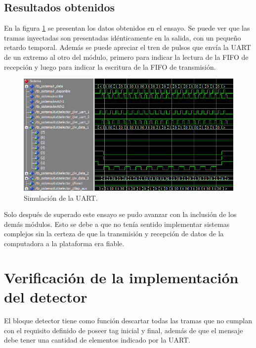 	\subsection{Resultados obtenidos}
				
		En la figura \ref{fig:Test_UART} se presentan los datos obtenidos en el ensayo. Se puede ver que las tramas inyectadas son presentadas idénticamente en la salida, con un pequeño retardo temporal. Además se puede apreciar el tren de pulsos que envía la UART de un extremo al otro del módulo, primero para indicar la lectura de la FIFO de recepción y luego para indicar la escritura de la FIFO de transmisión.
		
		\begin{figure}[h]
		\centering
		\includegraphics[scale=0.7]{./Figures/Test/UART}
			\caption{Simulación de la UART.}
			\label{fig:Test_UART}
		\end{figure}
			
		\vspace{10cm}
			
		Solo después de superado este ensayo se pudo avanzar con la inclusión de los demás módulos. Esto se debe a que no tenía sentido implementar sistemas complejos sin la certeza de que la transmisión y recepción de datos de la computadora a la plataforma era fiable. %
	
\section{Verificación de la implementación del detector}

	El bloque detector tiene como función descartar todas las tramas que no cumplan con el requisito definido de poseer tag inicial y final, además de que el mensaje debe tener una cantidad de elementos indicado por la UART.
	
